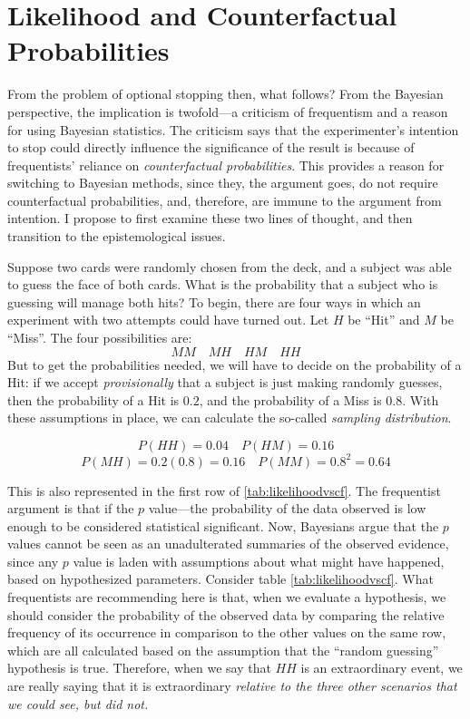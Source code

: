 \hypertarget{likelihood-and-counterfactual-probabilities}{%
\section{Likelihood and Counterfactual
Probabilities}\label{likelihood-and-counterfactual-probabilities}}

From the problem of optional stopping then, what follows? From the
Bayesian perspective, the implication is twofold---a criticism of frequentism and a reason for using Bayesian statistics. The criticism says that the
experimenter's intention to stop could directly influence the
significance of the result is because of frequentists' reliance on
\emph{counterfactual probabilities}. This provides a reason for switching to Bayesian methods, since they, the argument goes, do not require counterfactual probabilities, and, therefore, are immune to the argument from intention. I propose to first examine these two lines of thought, and then transition to the epistemological issues.

Suppose two cards were randomly chosen from the deck, and a subject was able to guess the face of both cards. What is the probability that a subject who is guessing will manage  both hits? To begin, there are four ways in which an experiment with
two attempts could have turned out. Let \(H\) be ``Hit'' and \(M\) be
``Miss''. The four possibilities are: \[MM \quad MH \quad HM \quad HH\] But
to get the probabilities needed, we will have to decide on the probability of a Hit: if we accept \emph{provisionally} that a subject is just making randomly guesses, then the probability of a Hit is $0.2$, and the probability of a Miss is $0.8$. With these assumptions in place, we can calculate the so-called \emph{sampling distribution}.

\[P(H  H)=0.04 \quad P(H  M)=0.16  \]
\[P(M H)=0.2(0.8)=0.16 \quad P(M M)=0.8^2=0.64 \]

This is also represented in the first row of \ref{tab:likelihoodvscf}. 
The frequentist argument is that if the $p$ value---the probability of the data observed is low enough to be considered statistical significant. Now, Bayesians argue that the $p$ values cannot be
seen as an unadulterated summaries of the observed evidence, since any $p$ value is laden with assumptions about what might have happened, based on hypothesized parameters. Consider table \ref{tab:likelihoodvscf}. What frequentists are recommending here is that, when we evaluate a hypothesis, we should consider the probability of the observed data by comparing the relative frequency of its occurrence in comparison to the other values on  the same row, which are all calculated based on the assumption that the ``random guessing'' hypothesis is true. Therefore, when we say that $HH$ is an extraordinary event, we are really saying that it is extraordinary \emph{relative to the three other scenarios that we could see, but did not.}

